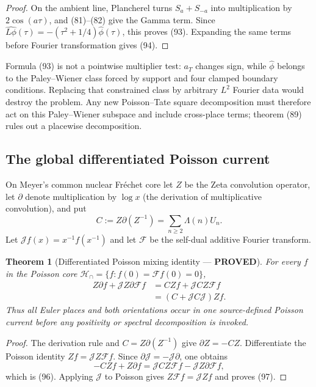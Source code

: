 \documentclass[11pt]{article}
\newtheorem{theorem}{Theorem}
\newcommand{\PROVED}{\textcolor{green!45!black}{\textbf{PROVED}}}
\begin{document}
\begin{proof}
On the ambient line, Plancherel turns $S_a+S_{-a}$ into multiplication by
$2\cos(a\tau)$, and (81)--(82) give the Gamma term.  Since
$\widehat{L\phi}(\tau)=-(\tau^2+1/4)\widehat\phi(\tau)$, this proves (93).
Expanding the same terms before Fourier transformation gives (94).
\end{proof}

Formula (93) is not a pointwise multiplier test: $a_T$ changes sign, while
$\widehat\phi$ belongs to the Paley--Wiener class forced by support and four
clamped boundary conditions.  Replacing that constrained class by arbitrary
$L^2$ Fourier data would destroy the problem.  Any new Poisson--Tate square
decomposition must therefore act on this Paley--Wiener subspace and include
cross-place terms; theorem (89) rules out a placewise decomposition.

\subsection{The global differentiated Poisson current}

On Meyer's common nuclear Fr\'echet core let $Z$ be the Zeta convolution
operator, let $\partial$ denote multiplication by $\log x$ (the derivation of
multiplicative convolution), and put
\begin{equation}
 C:=Z\partial(Z^{-1})=\sum_{n\ge2}\Lambda(n)U_n.       \tag{95}
\end{equation}
Let $\mathscr Jf(x)=x^{-1}f(x^{-1})$ and let $\mathcal F$ be the self-dual
additive Fourier transform.

\begin{theorem}[Differentiated Poisson mixing identity --- \PROVED]
For every $f$ in the Poisson core
$\mathcal H_\cap=\{f:f(0)=\mathcal Ff(0)=0\}$,
\begin{align}
 Z\partial f+\mathscr JZ\partial\mathcal Ff
 &=CZf+\mathscr JCZ\mathcal Ff                         \tag{96}\\
 &=(C+\mathscr JC\mathscr J)Zf.                        \tag{97}
\end{align}
Thus all Euler places and both orientations occur in one source-defined
Poisson current before any positivity or spectral decomposition is invoked.
\end{theorem}

\begin{proof}
The derivation rule and $C=Z\partial(Z^{-1})$ give
$\partial Z=-CZ$.  Differentiate the Poisson identity
$Zf=\mathscr JZ\mathcal Ff$.  Since
$\partial\mathscr J=-\mathscr J\partial$, one obtains
\[
 -CZf+Z\partial f
 =\mathscr JCZ\mathcal Ff-\mathscr JZ\partial\mathcal Ff,
\]
which is (96).  Applying $\mathscr J$ to Poisson gives
$Z\mathcal Ff=\mathscr JZf$ and proves (97).
\end{proof}
\end{document}
